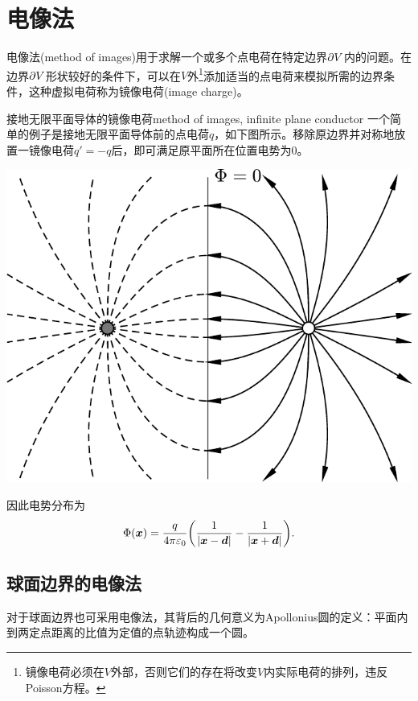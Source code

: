
\section{电像法}
\label{sec:method of images}

电像法(method of images)用于求解一个或多个点电荷在特定边界$\partial V$内的问题。在边界$\partial V$形状较好的条件下，可以在$V$外\footnote{镜像电荷必须在$V$外部，否则它们的存在将改变$V$内实际电荷的排列，违反Poisson方程。}添加适当的点电荷来模拟所需的边界条件，这种虚拟电荷称为镜像电荷(image charge)。
\begin{example}{接地无限平面导体的镜像电荷}{method of images, infinite plane conductor}
    一个简单的例子是接地无限平面导体前的点电荷$q$，如下图所示。移除原边界并对称地放置一镜像电荷$q'=-q$后，即可满足原平面所在位置电势为0。
    \begin{center}
        \includegraphics[width=0.6\linewidth]{figures/image_charge_plane.pdf}
        \label{fig:image charge of plane}
    \end{center}
    因此电势分布为
    \begin{equation}
        \Phi(\bm x)=\frac q{4\pi\varepsilon_0}\biggl(\frac1{\left\lvert\bm x-\bm d\right\rvert}-\frac1{\left\lvert\bm x+\bm d\right\rvert}\biggr).
    \end{equation}
\end{example}

\subsection{球面边界的电像法}
\label{ssec:method of images, sphere}

对于球面边界也可采用电像法，其背后的几何意义为Apollonius圆的定义：平面内到两定点距离的比值为定值的点轨迹构成一个圆。%

